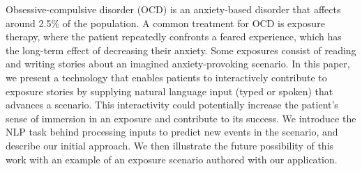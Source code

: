 Obsessive-compulsive disorder (OCD) is an anxiety-based disorder that affects around 2.5\% of the population. A common treatment for OCD is exposure therapy, where the patient repeatedly confronts a feared experience, which has the long-term effect of decreasing their anxiety. Some exposures consist of reading and writing stories about an imagined anxiety-provoking scenario. In this paper, we present a technology that enables patients to interactively contribute to exposure stories by supplying natural language input (typed or spoken) that advances a scenario. This interactivity could potentially increase the patient's sense of immersion in an exposure and contribute to its success. We introduce the NLP task behind processing inputs to predict new events in the scenario, and describe our initial approach. We then illustrate the future possibility of this work with an example of an exposure scenario authored with our application.
